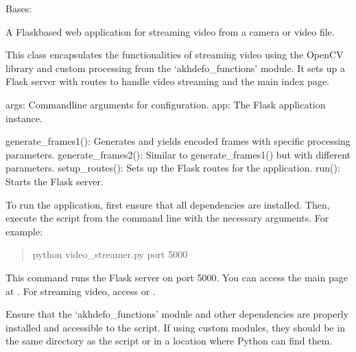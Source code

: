 \documentclass[letterpaper,10pt,english]{sphinxmanual}
\begin{document}
\begin{fulllineitems}
\label{\detokenize{akhdefo_functions:akhdefo_functions.video_streamer.VideoStreamer}}
\pysigstartsignatures
{}
\pysigstopsignatures
\sphinxAtStartPar
Bases: 

\sphinxAtStartPar
A Flask\sphinxhyphen{}based web application for streaming video from a camera or video file.

\sphinxAtStartPar
This class encapsulates the functionalities of streaming video using the OpenCV library
and custom processing from the ‘akhdefo\_functions’ module. It sets up a Flask server
with routes to handle video streaming and the main index page.
\begin{description}
\sphinxAtStartPar
args: Command\sphinxhyphen{}line arguments for configuration.
app: The Flask application instance.

\sphinxAtStartPar
generate\_frames1(): Generates and yields encoded frames with specific processing parameters.
generate\_frames2(): Similar to generate\_frames1() but with different parameters.
setup\_routes(): Sets up the Flask routes for the application.
run(): Starts the Flask server.

\sphinxAtStartPar
To run the application, first ensure that all dependencies are installed. Then, execute
the script from the command line with the necessary arguments. For example:
\begin{quote}

\sphinxAtStartPar
python video\_streamer.py \textendash{}port 5000
\end{quote}

\sphinxAtStartPar
This command runs the Flask server on port 5000. You can access the main page at
. For streaming video, access 
or .

\sphinxAtStartPar
Ensure that the ‘akhdefo\_functions’ module and other dependencies are properly installed
and accessible to the script. If using custom modules, they should be in the same directory
as the script or in a location where Python can find them.

\end{description}


\end{fulllineitems}
\end{document}
